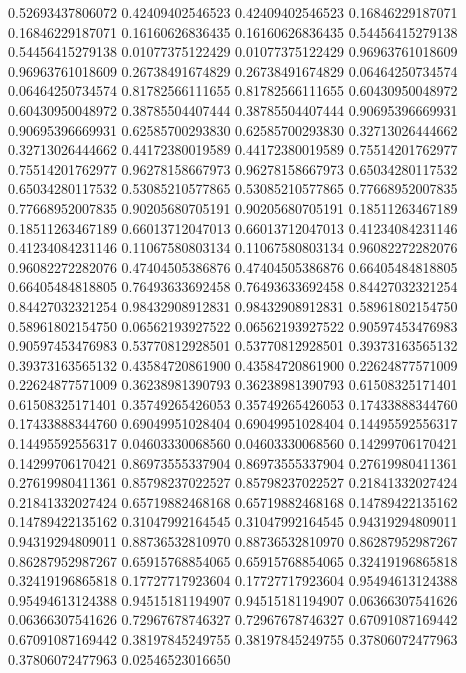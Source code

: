    0.52693437806072   0.42409402546523
   0.42409402546523   0.16846229187071
   0.16846229187071   0.16160626836435
   0.16160626836435   0.54456415279138
   0.54456415279138   0.01077375122429
   0.01077375122429   0.96963761018609
   0.96963761018609   0.26738491674829
   0.26738491674829   0.06464250734574
   0.06464250734574   0.81782566111655
   0.81782566111655   0.60430950048972
   0.60430950048972   0.38785504407444
   0.38785504407444   0.90695396669931
   0.90695396669931   0.62585700293830
   0.62585700293830   0.32713026444662
   0.32713026444662   0.44172380019589
   0.44172380019589   0.75514201762977
   0.75514201762977   0.96278158667973
   0.96278158667973   0.65034280117532
   0.65034280117532   0.53085210577865
   0.53085210577865   0.77668952007835
   0.77668952007835   0.90205680705191
   0.90205680705191   0.18511263467189
   0.18511263467189   0.66013712047013
   0.66013712047013   0.41234084231146
   0.41234084231146   0.11067580803134
   0.11067580803134   0.96082272282076
   0.96082272282076   0.47404505386876
   0.47404505386876   0.66405484818805
   0.66405484818805   0.76493633692458
   0.76493633692458   0.84427032321254
   0.84427032321254   0.98432908912831
   0.98432908912831   0.58961802154750
   0.58961802154750   0.06562193927522
   0.06562193927522   0.90597453476983
   0.90597453476983   0.53770812928501
   0.53770812928501   0.39373163565132
   0.39373163565132   0.43584720861900
   0.43584720861900   0.22624877571009
   0.22624877571009   0.36238981390793
   0.36238981390793   0.61508325171401
   0.61508325171401   0.35749265426053
   0.35749265426053   0.17433888344760
   0.17433888344760   0.69049951028404
   0.69049951028404   0.14495592556317
   0.14495592556317   0.04603330068560
   0.04603330068560   0.14299706170421
   0.14299706170421   0.86973555337904
   0.86973555337904   0.27619980411361
   0.27619980411361   0.85798237022527
   0.85798237022527   0.21841332027424
   0.21841332027424   0.65719882468168
   0.65719882468168   0.14789422135162
   0.14789422135162   0.31047992164545
   0.31047992164545   0.94319294809011
   0.94319294809011   0.88736532810970
   0.88736532810970   0.86287952987267
   0.86287952987267   0.65915768854065
   0.65915768854065   0.32419196865818
   0.32419196865818   0.17727717923604
   0.17727717923604   0.95494613124388
   0.95494613124388   0.94515181194907
   0.94515181194907   0.06366307541626
   0.06366307541626   0.72967678746327
   0.72967678746327   0.67091087169442
   0.67091087169442   0.38197845249755
   0.38197845249755   0.37806072477963
   0.37806072477963   0.02546523016650
